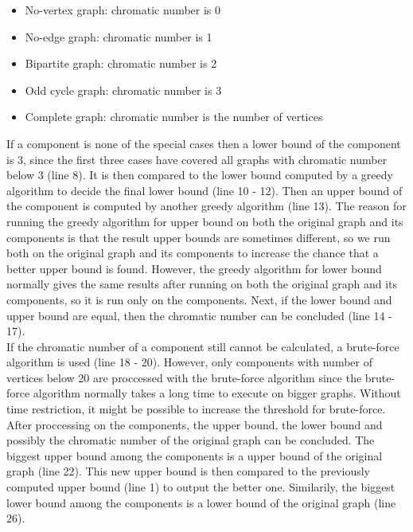 \documentclass[a4paper]{report}
\begin{document}
	\begin{itemize}
		\item No-vertex graph: chromatic number is 0
		\item No-edge graph: chromatic number is 1
		\item Bipartite graph: chromatic number is 2
		\item Odd cycle graph: chromatic number is 3
		\item Complete graph: chromatic number is the number of vertices
	\end{itemize}
	If a component is none of the special cases then a lower bound of the component is 3, since the first three cases have covered all graphs with chromatic number below 3 (line 8). It is then compared to the lower bound computed by a greedy algorithm to decide the final lower bound (line 10 - 12). Then an upper bound of the component is computed by another greedy algorithm (line 13). The reason for running the greedy algorithm for upper bound on both the original graph and its components is that the result upper bounds are sometimes different, so we run both on the original graph and its components to increase the chance that a better upper bound is found. However, the greedy algorithm for lower bound normally gives the same results after running on both the original graph and its components, so it is run only on the components. Next, if the lower bound and upper bound are equal, then the chromatic number can be concluded (line 14 - 17). \\
	
	If the chromatic number of a component still cannot be calculated, a brute-force algorithm is used (line 18 - 20). However, only components with number of vertices below 20 are proccessed with the brute-force algorithm since the brute-force algorithm normally takes a long time to execute on bigger graphs. Without time restriction, it might be possible to increase the threshold for brute-force.\\
	
	After proccessing on the components, the upper bound, the lower bound and possibly the chromatic number of the original graph can be concluded. The biggest upper bound among the components is a upper bound of the original graph (line 22). This new upper bound is then compared to the previously computed upper bound (line 1) to output the better one. Similarily, the biggest lower bound among the components is a lower bound of the original graph (line 26). \\
	
\end{document}
